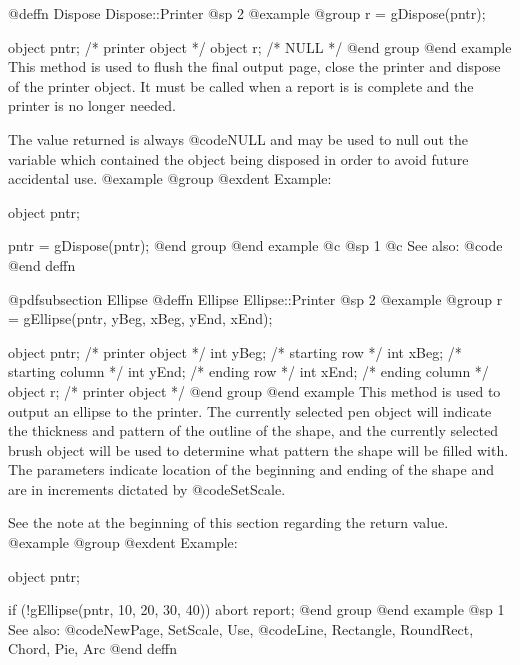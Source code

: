 @deffn {Dispose} Dispose::Printer
@sp 2
@example
@group
r = gDispose(pntr); 

object  pntr;   /*  printer object  */
object  r;      /*  NULL            */
@end group
@end example
This method is used to flush the final output page, close the printer and
dispose of the printer object.  It must be called when a report is
is complete and the printer is no longer needed.

The value returned is always @code{NULL} and may be used to null out
the variable which contained the object being disposed in order to
avoid future accidental use.
@example
@group
@exdent Example:

object  pntr;

pntr = gDispose(pntr);
@end group
@end example
@c @sp 1
@c See also:  @code{}
@end deffn
















@pdfsubsection {Ellipse}
@deffn {Ellipse} Ellipse::Printer
@sp 2
@example
@group
r = gEllipse(pntr, yBeg, xBeg, yEnd, xEnd);

object  pntr;   /*  printer object   */
int     yBeg;   /*  starting row     */
int     xBeg;   /*  starting column  */
int     yEnd;   /*  ending row       */
int     xEnd;   /*  ending column    */
object  r;      /*  printer object   */
@end group
@end example
This method is used to output an ellipse to the printer.  The currently
selected pen object will indicate the thickness and pattern of the
outline of the shape, and the currently selected brush object will be
used to determine what pattern the shape will be filled with.  The
parameters indicate location of the beginning and ending of the shape
and are in increments dictated by @code{SetScale}.

See the note at the beginning of this section regarding the return value.
@example
@group
@exdent Example:

object  pntr;

if (!gEllipse(pntr, 10, 20, 30, 40))
        abort report;
@end group
@end example
@sp 1
See also:  @code{NewPage, SetScale, Use,}
        @code{Line, Rectangle, RoundRect, Chord, Pie, Arc}
@end deffn













